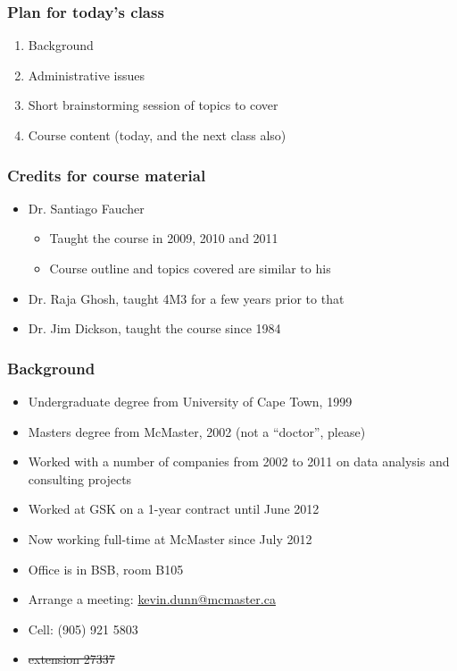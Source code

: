 
\begin{frame}\frametitle{Plan for today's class}
	\begin{enumerate}
		\item	Background
		\item	Administrative issues
		\item	Short brainstorming session of topics to cover
		\item	Course content (today, and the next class also)
	\end{enumerate}
\end{frame}

\begin{frame}\frametitle{Credits for course material}

	\begin{itemize}
		\item	Dr. Santiago Faucher
		\begin{itemize}
			\item	Taught the course in 2009, 2010 and 2011
			\item	Course outline and topics covered are similar to his
		\end{itemize}
		\item	Dr. Raja Ghosh, taught 4M3 for a few years prior to that
		\item	Dr. Jim Dickson, taught the course since 1984
	\end{itemize}
\end{frame}

\begin{frame}\frametitle{Background}
	{\color{myGreen}{About myself}}
	\begin{itemize}
		\item	Undergraduate degree from University of Cape Town, 1999
		\item	Masters degree from McMaster, 2002 (not a ``doctor'', please)
		\item	Worked with a number of companies from 2002 to 2011 on data analysis and consulting projects
		\item	Worked at GSK on a 1-year contract until June 2012
		\item	Now working full-time at McMaster since July 2012
		\item	Office is in BSB, room B105
		\item	Arrange a meeting: \url{kevin.dunn@mcmaster.ca}
		\item	Cell: (905) 921 5803
		\item	\sout{extension 27337}
	\end{itemize}
\end{frame}

